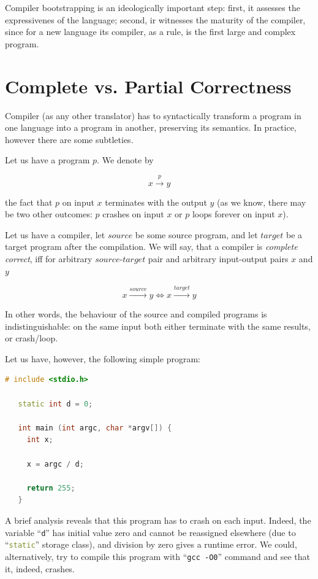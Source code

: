 \documentclass{article}
\begin{document}
Compiler bootstrapping is an ideologically important step: first, it assesses the expressivenes of the language; second, ir witnesses the
maturity of the compiler, since for a new language its compiler, as a rule, is the first large and complex program.

\section{Complete vs. Partial Correctness}

Compiler (as any other translator) has to syntactically transform a program in one language into a program in another, preserving its semantics.
In practice, however there are some subtleties.

Let us have a program $p$. We denote by

\[
x\xrightarrow{\displaystyle{p}} y
\]

the fact that $p$ on input $x$ terminates with the output $y$ (as we know, there may be two other outcomes: $p$ crashes on input $x$ or
$p$ loops forever on input $x$). 

Let us have a compiler, let $source$ be some source program, and let $target$ be a target program after the compilation.
We will say, that a compiler is \emph{complete correct}, iff for arbitrary $source$-$target$ pair and arbitrary
input-output pairs $x$ and $y$

\[
x\xrightarrow{\displaystyle{source}}y \Longleftrightarrow x\xrightarrow{\displaystyle{target}}y
\]

In other words, the behaviour of the source and compiled programs is indistinguishable: on the same input both either
terminate with the same results, or crash/loop.

Let us have, however, the following simple program:

\begin{lstlisting}[language=cc]
   # include <stdio.h>

   static int d = 0;

   int main (int argc, char *argv[]) {
     int x;

     x = argc / d;
    
     return 255;
   }  
\end{lstlisting}

A brief analysis reveals that this program has to crash on each input. Indeed, the variable ``\lstinline[language=cc,basicstyle=\normalsize]|d|'' has initial value zero and cannot
be reassigned elsewhere (due to ``\lstinline[language=cc,basicstyle=\normalsize]|static|'' storage class), and division by zero gives a runtime error. We could, alternatively,
try to compile this program with ``\texttt{gcc -O0}'' command and see that it, indeed, crashes.
\end{document}
